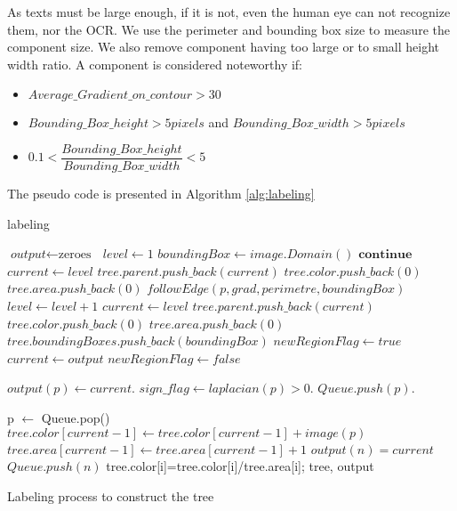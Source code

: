 \par 
As texts must be large enough, if it is not, even the human eye can not recognize them, nor the OCR. We use the perimeter and bounding box size to measure the component size. We also remove component having too large or to small height width ratio. A component is considered noteworthy if:
\begin{itemize} 
	\item $Average\_Gradient\_on\_contour > 30$
	\item $Bounding\_Box\_height >5 pixels $ and $Bounding\_Box\_width>5 pixels $
	\item $0.1 < \dfrac{Bounding\_Box\_height}{Bounding\_Box\_width} < 5 $  
\end{itemize}
\par
The pseudo code is presented in Algorithm \ref{alg:labeling}

\begin{algorithm}
\caption{labeling}\label{alg:labeling}
\begin{algorithmic}[1]
\State $\textit{output} \gets \text{zeroes }$
\State $ level \gets 1$
\State $ boundingBox \gets image.Domain()$
 $\textbf{continue}$
\EndIf
{}
	\State $current \gets level$
	\State $tree.parent.push\_back(current)$
	\State $tree.color.push\_back(0)$
	\State $tree.area.push\_back(0)$
\Else
	\State $followEdge(p,grad,perimetre,boundingBox)$
		\State $ level \gets level+1$
		\State $ current \gets level$
		\State $tree.parent.push\_back(current)$
		\State $tree.color.push\_back(0)$
		\State $tree.area.push\_back(0)$
		\State $tree.boundingBoxes.push\_back(boundingBox)$		
		\State $newRegionFlag \gets true$		
	\Else
		\State $current \gets output$
		\State $newRegionFlag \gets false$
	\EndIf
\EndIf

\State $output(p) \gets current $.
\State $sign\_flag \gets laplacian(p)>0$.
\State $Queue.push(p)$.

	\State p $\gets$ Queue.pop()
	\State $tree.color[current-1] \gets tree.color[current-1] + image(p) $
	\State $tree.area[current-1] \gets tree.area[current-1] + 1$
			\State $output(n) = current$
			\State $Queue.push(n)$
		\EndIf			
	\EndFor
\EndWhile
\EndFor
{}
	\State tree.color[i]=tree.color[i]/tree.area[i];
\EndFor
\State \Return tree, output
\EndProcedure
\end{algorithmic}
\caption{Labeling process to construct the tree}
\end{algorithm}

